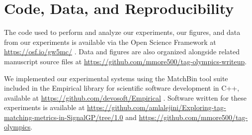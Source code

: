 \section{Code, Data, and Reproducibility}

The code used to perform and analyze our experiments, our figures, and data from our experiments is available via the Open Science Framework at \url{https://osf.io/gw5mc/} \citep{foster2017open}.
Data and figures are also organized alongside related manuscript source files at \url{https://github.com/mmore500/tag-olympics-writeup}.

We implemented our experimental systems using the MatchBin tool suite included in the Empirical library for scientific software development in C++, available at \url{https://github.com/devosoft/Empirical} \citep{charles_ofria_2019_2575607}.
Software written for these experiments is available at \url{https://github.com/amlalejini/Exploring-tag-matching-metrics-in-SignalGP/tree/1.0} and \url{https://github.com/mmore500/tag-olympics}.
